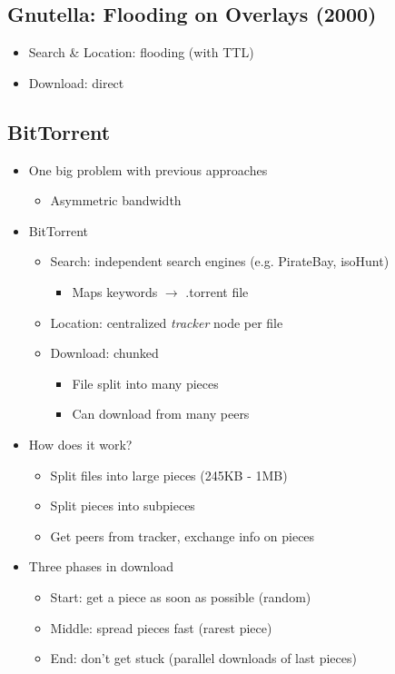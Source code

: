\subsection{Gnutella: Flooding on Overlays (2000)}
\begin{itemize}[nosep]
    \item Search \& Location: flooding (with TTL)
    \item Download: direct
\end{itemize}
\subsection{BitTorrent}
\begin{itemize}[nosep]
    \item One big problem with previous approaches
          \begin{itemize}[nosep]
              \item Asymmetric bandwidth
          \end{itemize}
    \item BitTorrent
          \begin{itemize}[nosep]
              \item Search: independent search engines (e.g. PirateBay, isoHunt)
                    \begin{itemize}[nosep]
                        \item Maps keywords $\to$ .torrent file
                    \end{itemize}
              \item Location: centralized \emph{tracker} node per file
              \item Download: chunked
                    \begin{itemize}[nosep]
                        \item File split into many pieces
                        \item Can download from many peers
                    \end{itemize}
          \end{itemize}
    \item How does it work?
          \begin{itemize}[nosep]
              \item Split files into large pieces (245KB - 1MB)
              \item Split pieces into subpieces
              \item Get peers from tracker, exchange info on pieces
          \end{itemize}
    \item Three phases in download
          \begin{itemize}[nosep]
              \item Start: get a piece as soon as possible (random)
              \item Middle: spread pieces fast (rarest piece)
              \item End: don't get stuck (parallel downloads of last pieces)
          \end{itemize}
\end{itemize}
